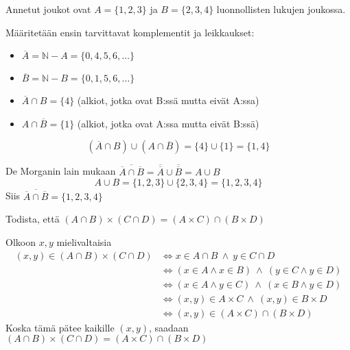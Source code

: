 \documentclass[12pt,a4paper]{article}
\newcommand{\N}{\mathbb{N}}
\begin{document}
\pagebreak
{}
\begin{kohta}
  \item %
  Annetut joukot ovat $A=\{1,2,3\}$ ja $B=\{2,3,4\}$ luonnollisten lukujen joukossa.
  
  Määritetään ensin tarvittavat komplementit ja leikkaukset:
  \begin{itemize}
      \item $\overline{A} = \N - A = \{0, 4, 5, 6, \ldots\}$
      \item $\overline{B} = \N - B = \{0, 1, 5, 6, \ldots\}$
      \item $\overline{A} \cap B = \{4\}$ (alkiot, jotka ovat B:ssä mutta eivät A:ssa)
      \item $A \cap \overline{B} = \{1\}$ (alkiot, jotka ovat A:ssa mutta eivät B:ssä)
  \end{itemize}

  \begin{alakohta}
    \item 
    \[
    (\overline{A}\cap B)\cup(A\cap\overline{B}) = \{4\} \cup \{1\} = \{1, 4\}
    \]

    \item De Morganin lain mukaan $\overline{\overline{A}\cap\overline{B}} = \overline{\overline{A}} \cup \overline{\overline{B}} = A \cup B$
    \[
    A \cup B = \{1,2,3\} \cup \{2,3,4\} = \{1,2,3,4\}
    \]
    Siis $\overline{\overline{A}\cap\overline{B}} = \{1,2,3,4\}$
  \end{alakohta}
  
  \item %
  Todista, että $(A\cap B)\times(C\cap D)=(A\times C)\cap(B\times D)$

  \medskip
Olkoon $x,y$ mielivaltaisia
\[
\begin{aligned}
(x,y)\in(A\cap B)\times(C\cap D)
&\iff x\in A\cap B \ \land\ y\in C\cap D\\
&\iff (x\in A\land x\in B)\ \land\ (y\in C\land y\in D)\\
&\iff (x\in A\land y\in C)\ \land\ (x\in B\land y\in D)\\
&\iff (x,y)\in A\times C \ \land\ (x,y)\in B\times D\\
&\iff (x,y)\in (A\times C)\cap(B\times D)
\end{aligned}
\]
Koska tämä pätee kaikille $(x,y)$, saadaan
\(
(A\cap B)\times(C\cap D)=(A\times C)\cap(B\times D)
\)

\pagebreak



\end{kohta}
\end{document}
